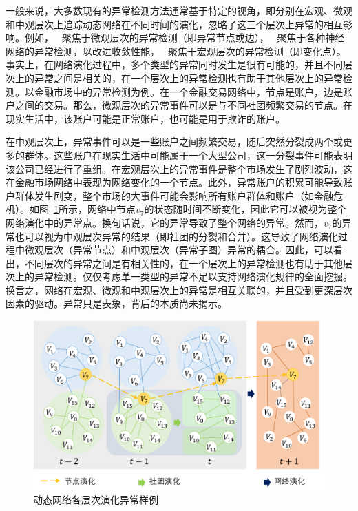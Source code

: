 一般来说，大多数现有的异常检测方法通常基于特定的视角，即分别在宏观、微观和中观层次上追踪动态网络在不同时间的演化，忽略了这三个层次上异常的相互影响。例如，~\cite{hassanzadeh2013semi,heard2010bayesian} 聚焦于微观层次的异常检测（即异常节点或边），~\cite{8648298,7953678,XIAO2019124} 聚焦于各种神经网络的异常检测，以改进收敛性能，~\cite{hulovatyy2016scout,cheung2020simultaneous} 聚焦于宏观层次的异常检测（即变化点）。事实上，在网络演化过程中，多个类型的异常同时发生是很有可能的，并且不同层次上的异常之间是相关的，在一个层次上的异常检测也有助于其他层次上的异常检测。以金融市场中的异常检测为例。在一个金融交易网络中，节点是账户，边是账户之间的交易。那么，微观层次的异常事件可以是与不同社团频繁交易的节点。在现实生活中，该账户可能是正常账户，也可能是用于欺诈的账户。


在中观层次上，异常事件可以是一些账户之间频繁交易，随后突然分裂成两个或更多的群体。这些账户在现实生活中可能属于一个大型公司，这一分裂事件可能表明该公司已经进行了重组。在宏观层次上的异常事件是整个市场发生了剧烈波动，这在金融市场网络中表现为网络变化的一个节点。此外，异常账户的积累可能导致账户群体发生剧变，整个市场的大事件可能会影响所有账户群体和账户（如金融危机）。如图~\ref{fig:example}所示，网络中节点$v_{7}$的状态随时间不断变化，因此它可以被视为整个网络演化中的异常点。换句话说，它的异常导致了整个网络的异常。然而，$v_{7}$的异常也可以视为中观层次异常的结果（即社团的分裂和合并）。这导致了网络演化过程中微观层次（异常节点）和中观层次（异常子图）异常的耦合。因此，可以看出，不同层次的异常之间是有相关性的，在一个层次上的异常检测也有助于其他层次上的异常检测。仅仅考虑单一类型的异常不足以支持网络演化规律的全面挖掘。换言之，网络在宏观、微观和中观层次上的异常是相互关联的，并且受到更深层次因素的驱动。异常只是表象，背后的本质尚未揭示。

\begin{figure}[htbp]
    \centering
    \includegraphics[width=.85\linewidth,trim=0.1in 0.5in 0.1in 0.1in]{figures/chap05/chap5motivation.png}
    \caption{动态网络各层次演化异常样例}
    \label{fig:example}
\end{figure} 





